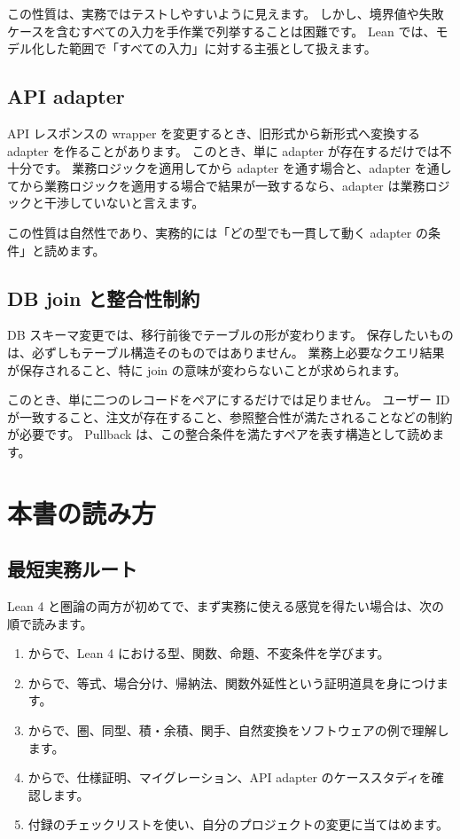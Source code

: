 この性質は、実務ではテストしやすいように見えます。
しかし、境界値や失敗ケースを含むすべての入力を手作業で列挙することは困難です。
Lean では、モデル化した範囲で「すべての入力」に対する主張として扱えます。

\subsection{API adapter}

API レスポンスの wrapper を変更するとき、旧形式から新形式へ変換する adapter を作ることがあります。
このとき、単に adapter が存在するだけでは不十分です。
業務ロジックを適用してから adapter を通す場合と、adapter を通してから業務ロジックを適用する場合で結果が一致するなら、adapter は業務ロジックと干渉していないと言えます。

この性質は自然性であり、実務的には「どの型でも一貫して動く adapter の条件」と読めます。

\subsection{DB join と整合性制約}

DB スキーマ変更では、移行前後でテーブルの形が変わります。
保存したいものは、必ずしもテーブル構造そのものではありません。
業務上必要なクエリ結果が保存されること、特に join の意味が変わらないことが求められます。

このとき、単に二つのレコードをペアにするだけでは足りません。
ユーザー ID が一致すること、注文が存在すること、参照整合性が満たされることなどの制約が必要です。
Pullback は、この整合条件を満たすペアを表す構造として読めます。

\section{本書の読み方}
\label{sec:ch00-reading-guide}

\subsection{最短実務ルート}

Lean 4 と圏論の両方が初めてで、まず実務に使える感覚を得たい場合は、次の順で読みます。

\begin{enumerate}
\item {}からで、Lean 4 における型、関数、命題、不変条件を学びます。
\item {}からで、等式、場合分け、帰納法、関数外延性という証明道具を身につけます。
\item {}からで、圏、同型、積・余積、関手、自然変換をソフトウェアの例で理解します。
\item {}からで、仕様証明、マイグレーション、API adapter のケーススタディを確認します。
\item 付録のチェックリストを使い、自分のプロジェクトの変更に当てはめます。
\end{enumerate}


